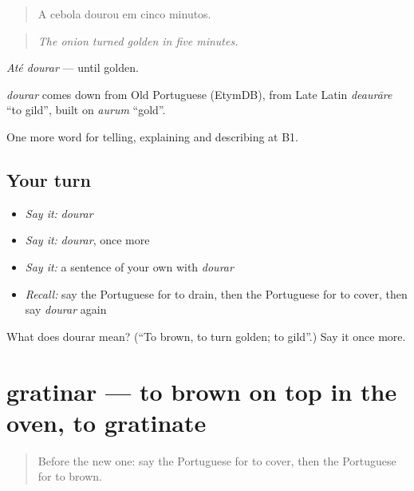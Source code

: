 \begin{quote}
A cebola dourou em cinco minutos.
\end{quote}

\begin{quote}
\emph{The onion turned golden in five minutes.}
\end{quote}

\emph{Até dourar} — until golden.

\begin{cousinweb}
\emph{dourar} comes down from Old Portuguese (EtymDB), from Late Latin \emph{deaurāre} \textquotedblleft{}to gild\textquotedblright{}, built on \emph{aurum} \textquotedblleft{}gold\textquotedblright{}.
\end{cousinweb}

\begin{grammarlens}[title={What you've built}]
One more word for telling, explaining and describing at B1.
\end{grammarlens}

\subsection*{Your turn}
\begin{itemize}
\raggedright
  \item \emph{Say it:} \emph{dourar}
  \item \emph{Say it:} \emph{dourar}, once more
  \item \emph{Say it:} a sentence of your own with \emph{dourar}
  \item \emph{Recall:} say the Portuguese for to drain, then the Portuguese for to cover, then say \emph{dourar} again
\end{itemize}

\begin{tcolorbox}[breakable,colback=teal!4,colframe=teal!35!black,title={Before you move on}]
What does dourar mean? (\textquotedblleft{}To brown, to turn golden; to gild\textquotedblright{}.) Say it once more.
\end{tcolorbox}
\section[gratinar]{gratinar — to brown on top in the oven, to gratinate}

\label{lesson:PT-C334-gratinar}



\begin{quote}
Before the new one: say the Portuguese for to cover, then the Portuguese for to brown.
\end{quote}

